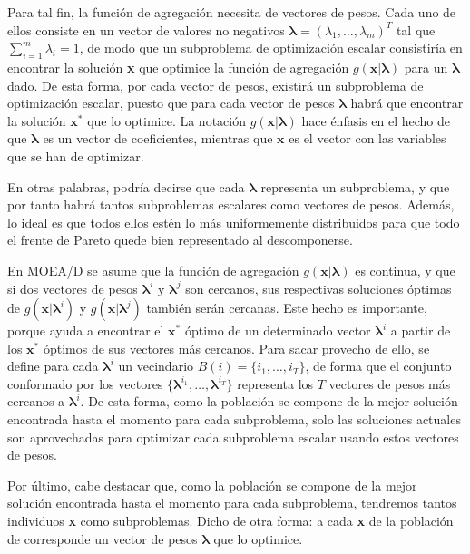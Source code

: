 Para tal fin, la función de agregación necesita de vectores de pesos. Cada uno de ellos consiste en un vector de valores no negativos $\boldsymbol\lambda = (\lambda_1,\dots,\lambda_m)^T$ tal que $\sum_{i=1}^m \lambda_i = 1$, de modo que un subproblema de optimización escalar consistiría en encontrar la solución \textbf{x} que optimice la función de agregación $g(\textbf{x} | \boldsymbol\lambda)$ para un $\boldsymbol\lambda$ dado. De esta forma, por cada vector de pesos, existirá un subproblema de optimización escalar, puesto que para cada vector de pesos $\boldsymbol\lambda$ habrá que encontrar la solución $\textbf{x}^*$ que lo optimice. La notación $g(\textbf{x} | \boldsymbol\lambda)$ hace énfasis en el hecho de que $\boldsymbol\lambda$ es un vector de coeficientes, mientras que $\textbf{x}$ es el vector con las variables que se han de optimizar.

En otras palabras, podría decirse que cada $\boldsymbol\lambda$  representa un subproblema, y que por tanto habrá tantos subproblemas escalares como vectores de pesos. Además, lo ideal es que todos ellos estén lo más uniformemente distribuidos para que todo el frente de Pareto quede bien representado al descomponerse.

En MOEA/D se asume que la función de agregación $g(\textbf{x} | \boldsymbol\lambda)$ es continua, y que si dos vectores de pesos $\boldsymbol\lambda^i$ y $\boldsymbol\lambda^j$ son cercanos, sus respectivas soluciones óptimas de $g(\textbf{x} | \boldsymbol\lambda^i)$ y $g(\textbf{x} | \boldsymbol\lambda^j)$ también serán cercanas. Este hecho es importante, porque ayuda a encontrar el $\textbf{x}^*$ óptimo de un determinado vector $\boldsymbol\lambda^i$ a partir de los $\textbf{x}^*$ óptimos de sus vectores más cercanos. Para sacar provecho de ello, se define para cada $\boldsymbol\lambda^i$ un vecindario $B(i) = \{i_1,\dots,i_T\}$, de forma que el conjunto conformado por los vectores $\{\boldsymbol\lambda^{i_1},\dots,\boldsymbol\lambda^{i_T}\}$ representa los $T$ vectores de pesos más cercanos a $\boldsymbol\lambda^i$. De esta forma, como la población se compone de la mejor solución encontrada hasta el momento para cada subproblema, solo las soluciones actuales son aprovechadas para optimizar cada subproblema escalar usando estos vectores de pesos.

Por último, cabe destacar que, como la población se compone de la mejor solución encontrada hasta el momento para cada subproblema, tendremos tantos individuos \textbf{x} como subproblemas. Dicho de otra forma: a cada \textbf{x} de la población de corresponde un vector de pesos $\boldsymbol\lambda$ que lo optimice.

